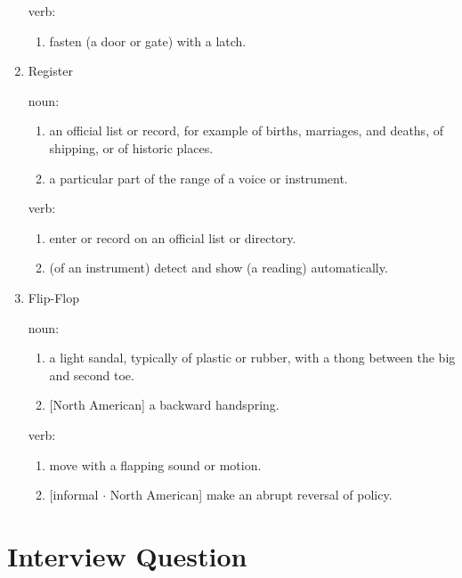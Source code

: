 \documentclass[12pt]{article}
\begin{document}
\begin{enumerate}
  verb:

  \begin{enumerate}
    \item fasten (a door or gate) with a latch.
  \end{enumerate}

  \item{Register}

  noun:

  \begin{enumerate}
    \item an official list or record, for example of births, marriages, and deaths, of shipping, or of historic places.
    \item a particular part of the range of a voice or instrument.
  \end{enumerate}

  verb:

  \begin{enumerate}
    \item enter or record on an official list or directory.
    \item (of an instrument) detect and show (a reading) automatically.
  \end{enumerate}

  \item{Flip-Flop}

  noun:

  \begin{enumerate}
    \item a light sandal, typically of plastic or rubber, with a thong between the big and second toe.
    \item {[North American]} a backward handspring.
  \end{enumerate}

  verb:

  \begin{enumerate}
    \item move with a flapping sound or motion.
    \item {[informal $\cdot$ North American]} make an abrupt reversal of policy.
  \end{enumerate}
\end{enumerate}

\section{Interview Question}
\end{document}
